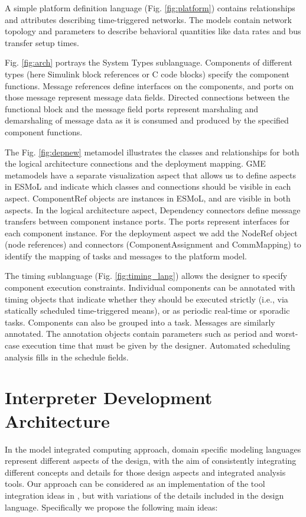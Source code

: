 A simple platform definition language (Fig. \ref{fig:platform}) contains relationships and attributes 
describing time-triggered networks.  The models contain network topology and parameters to describe 
behavioral quantities like data rates and bus transfer setup times.

Fig. \ref{fig:arch} portrays the System Types sublanguage.  Components of different types (here 
Simulink block references or C code blocks) specify the component functions.  Message references 
define interfaces on the components, and ports on those message represent message data fields.  
Directed connections between the functional block and the message field ports represent marshaling
and demarshaling of message data as it is consumed and produced by the specified component functions.

The Fig. \ref{fig:depnew}  metamodel illustrates the classes and relationships for both the logical
architecture connections and the deployment mapping.  GME metamodels have a separate visualization 
aspect that allows us to define aspects in ESMoL and indicate which classes and connections should be
visible in each aspect.  ComponentRef objects are instances in ESMoL, and are visible in both aspects.
In the logical architecture aspect, Dependency connectors define message transfers between component 
instance ports.  The ports represent interfaces for each component instance.  For the deployment aspect
we add the NodeRef object (node references) and connectors (ComponentAssignment and CommMapping) to identify
the mapping of tasks and messages to the platform model.

The timing sublanguage (Fig. \ref{fig:timing_lang}) allows the designer to specify component execution
constraints.  Individual components can be annotated with timing objects that indicate 
whether they should be executed strictly (i.e., via statically scheduled time-triggered means), or as
periodic real-time or sporadic tasks.  Components can also be grouped into a task.  Messages are similarly
annotated.  The annotation objects contain parameters such as period and worst-case execution time that
must be given by the designer.  Automated scheduling analysis fills in the schedule fields.

\section{Interpreter Development Architecture}
\label{sect:twostage}

In the model integrated computing approach, domain specific modeling languages represent 
different aspects of the design, with the aim  of consistently integrating different concepts and details for those design aspects and integrated analysis tools.
Our approach can be considered as an implementation of the tool integration ideas 
in \cite{modeling:hybrid_abs}, but with variations of the details included in the design language.  
Specifically we propose the following main ideas:

